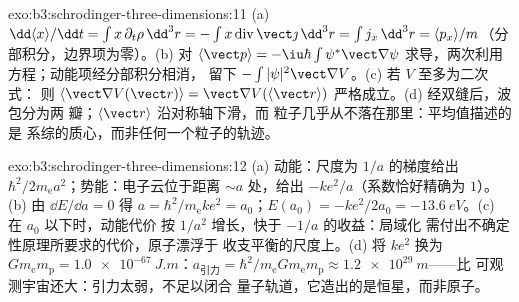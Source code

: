 \begin{solution}{exo:b3:schrodinger-three-dimensions:11}
(a) $\dd\langle x\rangle/\dd t = \int x\,\partial_t\rho\,\dd^3r =
-\int x\operatorname{div}\vect\jmath\,\dd^3r = \int j_x\,\dd^3r =
\langle p_x\rangle/m$（分部积分，边界项为零）。(b)
对 $\langle\vect p\rangle = -\iu\hbar\int\psi^*\vect\nabla
\psi$ 求导，两次利用方程；动能项经分部积分相消，
留下 $-\int|\psi|^2\vect\nabla V$。(c) 若 $V$ 至多为二次式：
则 $\langle\vect\nabla V(\vect r)\rangle = \vect\nabla V(\langle
\vect r\rangle)$ 严格成立。(d) 经双缝后，波包分为两
瓣；$\langle\vect r\rangle$ 沿对称轴下滑，而
粒子几乎从不落在那里：平均值描述的是
系综的质心，而非任何一个粒子的轨迹。
\end{solution}

\begin{solution}{exo:b3:schrodinger-three-dimensions:12}
(a) 动能：尺度为 $1/a$ 的梯度给出 $\hbar^2/2m_{\text{e}}
a^2$；势能：电子云位于距离 $\sim a$ 处，给出
$-ke^2/a$（系数恰好精确为 $1$）。(b) 由 $\dd E/\dd
a = 0$ 得 $a = \hbar^2/m_{\text{e}}ke^2 = a_0$；$E(a_0) =
-ke^2/2a_0 = \qty{-13.6}{eV}$。(c) 在 $a_0$ 以下时，动能代价
按 $1/a^2$ 增长，快于 $-1/a$ 的收益：局域化
需付出不确定性原理所要求的代价，原子漂浮于
收支平衡的尺度上。(d) 将 $ke^2$ 换为 $Gm_{\text{e}}m_{\text{p}} =
\qty{1.0e-67}{J.m}$：$a_{\text{引力}} = \hbar^2/m_{\text{e}}G
m_{\text{e}}m_{\text{p}} \approx \qty{1.2e29}{m}$——比
可观测宇宙还大：引力太弱，不足以闭合
量子轨道，它造出的是恒星，而非原子。
\end{solution}

